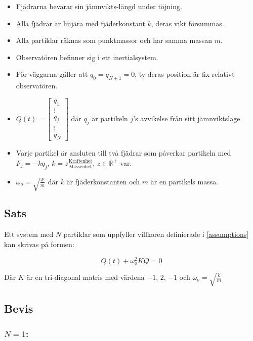 \documentclass[12pt,a4paper]{article}
\newcommand{\R}{\ensuremath{\mathbb{R}}}
\begin{document}
\begin{appendix}
		\begin{itemize}
			\item Fjädrarna bevarar sin jämnvikts-längd under töjning.
			\item Alla fjädrar är linjära med fjäderkonstant $k$, deras vikt försummas.
			\item Alla partiklar räknas som punktmassor och har samma massan $m$.
			\item Observatören befinner sig i ett inertialsystem.
			\item För väggarna gäller att $q_0 = q_{N+1} = 0$, ty deras position är fix relativt observatören.
			\item $Q(t)=\begin{bmatrix}q_1 \\ \vdots \\ q_j \\ \vdots \\ q_N \end{bmatrix}$ där $q_j$ är
			      partikeln $j$'s avvikelse från sitt jämnviktsläge.
			\item Varje partikel är ansluten till två fjädrar som påverkar partikeln
			      med $F_j = -k q_j$, $k = z\frac{\mathrm{Kraftenhet}}{\mathrm{Massenhet}}$, $z\in \R^{+}$
			      var.
			\item $\omega_o = \sqrt{\frac{k}{m}}$ där $k$ är fjäderkonstanten och $m$ är en partikels massa.
		\end{itemize}
	
	
	\subsection{Sats}
		\label{sats}
		
		Ett system med $N$ partiklar som uppfyller villkoren definierade i \ref{assumptions} kan skrivas
		på formen:
		
		\begin{equation*}
			\ddot{Q}(t) + \omega_{o}^{2} K Q = 0
		\end{equation*}
		
		Där $K$ är en tri-diagonal matris med värdena $-1$, $2$, $-1$ och $\omega_o = \sqrt{\frac{k}{m}}$
		
	\newpage
	
	\subsection{Bevis}
	\subsubsection*{$N=1$:}
		

\end{appendix}
\end{document}
